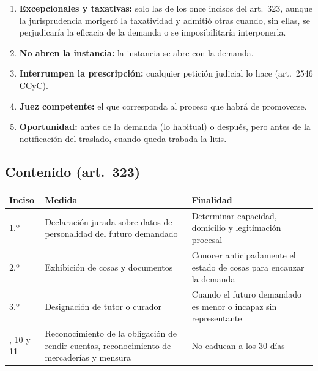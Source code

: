 \documentclass[12pt,oneside]{book}
\renewcommand{\arraystretch}{1.15}
\begin{document}
\begin{enumerate}[label=\alph*)]
\item \textbf{Excepcionales y taxativas:} solo las de los once incisos del art.~323, aunque la jurisprudencia morigeró la taxatividad y admitió otras cuando, sin ellas, se perjudicaría la eficacia de la demanda o se imposibilitaría interponerla.
\item \textbf{No abren la instancia:} la instancia se abre con la demanda.
\item \textbf{Interrumpen la prescripción:} cualquier petición judicial lo hace (art.~2546 CCyC).
\item \textbf{Juez competente:} el que corresponda al proceso que habrá de promoverse.
\item \textbf{Oportunidad:} antes de la demanda (lo habitual) o después, pero antes de la notificación del traslado, cuando queda trabada la litis.
\end{enumerate}

\subsection{Contenido (art.~323)}

\begin{table}[H]
\centering
\renewcommand{\arraystretch}{1.25}
\begin{tabularx}{\textwidth}{>{\RaggedRight\arraybackslash}p{}>{\RaggedRight\arraybackslash}X>{\RaggedRight\arraybackslash}X}
\toprule
\textbf{Inciso} & \textbf{Medida} & \textbf{Finalidad} \\
\midrule
1.º & Declaración jurada sobre datos de personalidad del futuro demandado & Determinar capacidad, domicilio y legitimación procesal \\
2.º & Exhibición de cosas y documentos & Conocer anticipadamente el estado de cosas para encauzar la demanda \\
3.º & Designación de tutor o curador & Cuando el futuro demandado es menor o incapaz sin representante \\
9, 10 y 11 & Reconocimiento de la obligación de rendir cuentas, reconocimiento de mercaderías y mensura & No caducan a los 30 días \\
\bottomrule
\end{tabularx}
\end{table}

\end{document}
